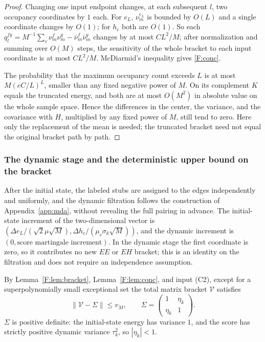 \begin{proof}
Changing one input endpoint changes, at each subsequent $l$, two occupancy coordinates by $1$
each. For $e_L$, $\nu^{e_L}_m$ is bounded by $O(L)$ and a single coordinate changes by $O(1)$;
for $h_c$ both are $O(1)$. So each
$q_l^{fg}=M^{-1}\sum_v\nu^f_m\nu^g_m-\bar\nu^f_m\bar\nu^g_m$ changes by at most $CL^2/M$; after
normalization and summing over $O(M)$ steps, the sensitivity of the whole bracket to each input
coordinate is at most $CL^2/M$. McDiarmid's inequality gives \eqref{F:conc}.

The probability that the maximum occupancy count exceeds $L$ is at most $M(eC/L)^L$, smaller than
any fixed negative power of $M$. On its complement $K$ equals the truncated energy, and both are
at most $O(M^2)$ in absolute value on the whole sample space. Hence the differences in the center,
the variance, and the covariance with $H$, multiplied by any fixed power of $M$, still tend to
zero. Here only the replacement of the mean is needed; the truncated bracket need not equal the
original bracket path by path.
\end{proof}

\subsubsection{The dynamic stage and the deterministic upper bound on the bracket}

After the initial state, the labeled stubs are assigned to the edges independently and uniformly,
and the dynamic filtration follows the construction of Appendix~\ref{app:mda}, without revealing
the full pairing in advance. The initial-state increment of the two-dimensional vector is
$(\Delta e_L/(\sqrt2\mu\sqrt M),\Delta h_c/(\mu_c\sigma_k\sqrt M))$, and the dynamic increment is
$(0,\text{score martingale increment})$. In the dynamic stage the first coordinate is zero, so it
contributes no new $EE$ or $EH$ bracket; this is an identity on the filtration and does not
require an independence assumption.

By Lemma~\ref{F:lem:bracket}, Lemma~\ref{F:lem:conc}, and input (C2), except for a
superpolynomially small exceptional set the total matrix bracket $\mathcal V$ satisfies
\begin{equation}
\|\mathcal V-\Sigma\|\le v_M,\qquad \Sigma=\begin{pmatrix}1&\eta_k\\\eta_k&1\end{pmatrix}.\label{F:Sigma}
\end{equation}
$\Sigma$ is positive definite: the initial-state energy has variance $1$, and the score has
strictly positive dynamic variance $\tau_k^2$, so $|\eta_k|<1$.

